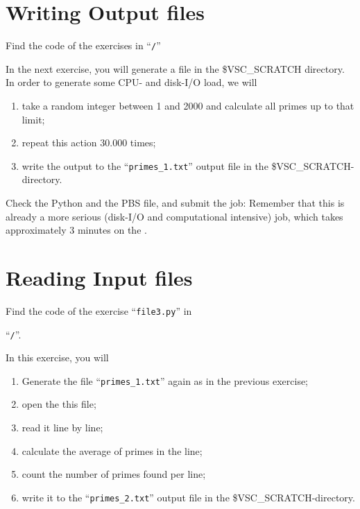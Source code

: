 \section{Writing Output files}

\begin{tip}
Find the code of the exercises in ``\texttt{\tilde/\exampledir}''
\end{tip}

In the next exercise, you will generate a file in the \$VSC\_SCRATCH directory.
In order to generate some CPU- and disk-I/O load, we will

\begin{enumerate}
\item  take a random integer between 1 and 2000 and calculate all primes up to that limit;
\item  repeat this action 30.000 times;
\item  write the output to the ``\texttt{primes\_1.txt}'' output file in the \$VSC\_SCRATCH-directory.
\end{enumerate}

Check the Python and the PBS file, and submit the job: Remember that this is
already a more serious (disk-I/O and computational intensive) job, which takes
approximately 3 minutes on the \hpc.

\begin{prompt}
\end{prompt}

\section{Reading Input files}

\begin{tip}
Find the code of the exercise ``\texttt{file3.py}'' in

``\texttt{\tilde/\exampledir}''.
\end{tip}

In this exercise, you will
\begin{enumerate}
\item  Generate the file ``\texttt{primes\_1.txt}'' again as in the previous exercise;
\item  open the this file;
\item  read it line by line;
\item  calculate the average of primes in the line;
\item  count the number of primes found per line;
\item  write it to the ``\texttt{primes\_2.txt}'' output file in the \$VSC\_SCRATCH-directory.
\end{enumerate}

